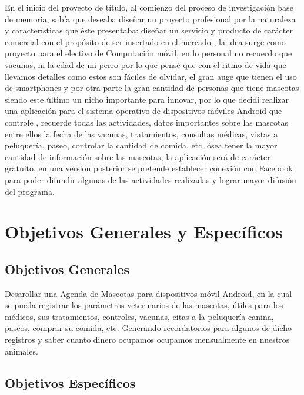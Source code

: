 \documentclass[letterpaper,12pt,openany,oneside]{book}
\begin{document}
En el inicio del proyecto de t\'itulo, al comienzo del proceso de investigaci\'on base de memoria, sab\'ia que deseaba diseñar un proyecto profesional por la naturaleza y caracter\'isticas que éste presentaba: 
diseñar un servicio y producto de car\'acter comercial con el prop\'osito de ser insertado en el mercado , la idea surge como proyecto para el electivo de Computaci\'on m\'ovil, en lo personal no recuerdo que vacunas, ni la edad de mi perro por lo que pensé que con el ritmo de vida que llevamos detalles como estos son f\'aciles de olvidar, el gran auge que tienen el uso de smartphones y por otra parte la gran cantidad de personas que tiene mascotas siendo este \'ultimo un nicho importante para innovar, por lo que decid\'i realizar una aplicaci\'on para el sistema operativo de dispositivos m\'oviles Android que controle ,  recuerde todas las actividades, datos importantes sobre las mascotas entre ellos la fecha de las vacunas, tratamientos, consultas médicas, vistas a peluquer\'ia, paseo, controlar la cantidad de comida, etc. \'osea tener la mayor cantidad de informaci\'on sobre las mascotas, la aplicaci\'on ser\'a de car\'acter gratuito, en una version posterior se pretende establecer conexi\'on con Facebook para poder difundir algunas de las actividades realizadas y lograr mayor difusi\'on del programa.



\newpage

\section{Objetivos Generales y Espec\'ificos}

\subsection{Objetivos Generales}




Desarollar una Agenda de Mascotas para dispositivos m\'ovil Android, en la cual se pueda registrar los par\'ametros veterinarios de las mascotas, \'utiles para los médicos, sus tratamientos, controles, vacunas, citas a la peluquer\'ia canina, paseos, comprar su comida,  etc. Generando recordatorios para algunos de dicho registros y saber cuanto dinero ocupamos ocupamos mensualmente en nuestros animales.



\subsection{Objetivos Espec\'ificos}
\end{document}
